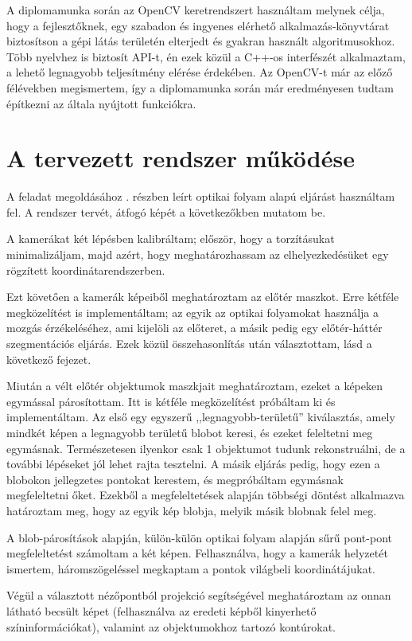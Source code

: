 A diplomamunka során az OpenCV \cite{opencv} keretrendszert használtam melynek célja, hogy a fejlesztőknek, egy szabadon és ingyenes elérhető alkalmazás-könyvtárat biztosítson a gépi látás területén elterjedt és gyakran használt algoritmusokhoz. Több nyelvhez is biztosít API-t, én ezek közül a C++-os interfészét alkalmaztam, a lehető legnagyobb teljesítmény elérése érdekében. Az OpenCV-t már az előző félévekben megismertem, így a diplomamunka során már eredményesen tudtam építkezni az általa nyújtott funkciókra.

\section{A tervezett rendszer működése}

A feladat megoldásához . részben leírt optikai folyam alapú eljárást használtam fel. A rendszer tervét, átfogó képét a következőkben mutatom be.

A kamerákat két lépésben kalibráltam; először, hogy a torzításukat minimalizáljam, majd azért, hogy meghatározhassam az elhelyezkedésüket egy rögzített koordinátarendszerben.

Ezt követően a kamerák képeiből meghatároztam az előtér maszkot. Erre kétféle megközelítést is implementáltam; az egyik az optikai folyamokat használja a mozgás érzékeléséhez, ami kijelöli az előteret, a másik pedig egy előtér-háttér szegmentációs eljárás. Ezek közül összehasonlítás után választottam, lásd a következő fejezet.

Miután a vélt előtér objektumok maszkjait meghatároztam, ezeket a képeken egymással párosítottam. Itt is kétféle megközelítést próbáltam ki és implementáltam. Az első egy egyszerű ,,legnagyobb-területű'' kiválasztás, amely mindkét képen a legnagyobb területű blobot keresi, és ezeket feleltetni meg egymásnak. Természetesen ilyenkor csak 1 objektumot tudunk rekonstruálni, de a további lépéseket jól lehet rajta tesztelni. A másik eljárás pedig, hogy ezen a blobokon jellegzetes pontokat kerestem, és megpróbáltam egymásnak megfeleltetni őket. Ezekből a megfeleltetések alapján többségi döntést alkalmazva határoztam meg, hogy az egyik kép blobja, melyik másik blobnak felel meg.

A blob-párosítások alapján, külön-külön optikai folyam alapján sűrű pont-pont megfeleltetést számoltam a két képen. Felhasználva, hogy a kamerák helyzetét ismertem, háromszögeléssel megkaptam a pontok világbeli koordinátájukat. 

Végül a választott nézőpontból projekció segítségével meghatároztam az onnan látható becsült képet (felhasználva az eredeti képből kinyerhető színinformációkat), valamint az objektumokhoz tartozó kontúrokat.

